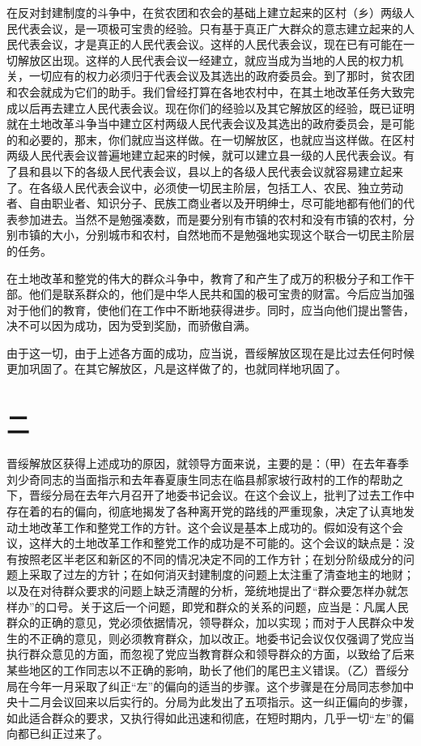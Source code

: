 在反对封建制度的斗争中，在贫农团和农会的基础上建立起来的区村（乡）两级人民代表会议，是一项极可宝贵的经验。只有基于真正广大群众的意志建立起来的人民代表会议，才是真正的人民代表会议。这样的人民代表会议，现在已有可能在一切解放区出现。这样的人民代表会议一经建立，就应当成为当地的人民的权力机关，一切应有的权力必须归于代表会议及其选出的政府委员会。到了那时，贫农团和农会就成为它们的助手。我们曾经打算在各地农村中，在其土地改革任务大致完成以后再去建立人民代表会议。现在你们的经验以及其它解放区的经验，既已证明就在土地改革斗争当中建立区村两级人民代表会议及其选出的政府委员会，是可能的和必要的，那末，你们就应当这样做。在一切解放区，也就应当这样做。在区村两级人民代表会议普遍地建立起来的时候，就可以建立县一级的人民代表会议。有了县和县以下的各级人民代表会议，县以上的各级人民代表会议就容易建立起来了。在各级人民代表会议中，必须使一切民主阶层，包括工人、农民、独立劳动者、自由职业者、知识分子、民族工商业者以及开明绅士，尽可能地都有他们的代表参加进去。当然不是勉强凑数，而是要分别有市镇的农村和没有市镇的农村，分别市镇的大小，分别城市和农村，自然地而不是勉强地实现这个联合一切民主阶层的任务。

在土地改革和整党的伟大的群众斗争中，教育了和产生了成万的积极分子和工作干部。他们是联系群众的，他们是中华人民共和国的极可宝贵的财富。今后应当加强对于他们的教育，使他们在工作中不断地获得进步。同时，应当向他们提出警告，决不可以因为成功，因为受到奖励，而骄傲自满。

由于这一切，由于上述各方面的成功，应当说，晋绥解放区现在是比过去任何时候更加巩固了。在其它解放区，凡是这样做了的，也就同样地巩固了。

\section*{二}

晋绥解放区获得上述成功的原因，就领导方面来说，主要的是：（甲）在去年春季刘少奇同志的当面指示和去年春夏康生同志在临县郝家坡行政村的工作的帮助之下，晋绥分局在去年六月召开了地委书记会议。在这个会议上，批判了过去工作中存在着的右的偏向，彻底地揭发了各种离开党的路线的严重现象，决定了认真地发动土地改革工作和整党工作的方针。这个会议是基本上成功的。假如没有这个会议，这样大的土地改革工作和整党工作的成功是不可能的。这个会议的缺点是：没有按照老区半老区和新区的不同的情况决定不同的工作方针；在划分阶级成分的问题上采取了过左的方针；在如何消灭封建制度的问题上太注重了清查地主的地财；以及在对待群众要求的问题上缺乏清醒的分析，笼统地提出了“群众要怎样办就怎样办”的口号。关于这后一个问题，即党和群众的关系的问题，应当是：凡属人民群众的正确的意见，党必须依据情况，领导群众，加以实现；而对于人民群众中发生的不正确的意见，则必须教育群众，加以改正。地委书记会议仅仅强调了党应当执行群众意见的方面，而忽视了党应当教育群众和领导群众的方面，以致给了后来某些地区的工作同志以不正确的影响，助长了他们的尾巴主义错误。（乙）晋绥分局在今年一月采取了纠正“左”的偏向的适当的步骤。这个步骤是在分局同志参加中央十二月会议回来以后实行的。分局为此发出了五项指示。这一纠正偏向的步骤，如此适合群众的要求，又执行得如此迅速和彻底，在短时期内，几乎一切“左”的偏向都已纠正过来了。

